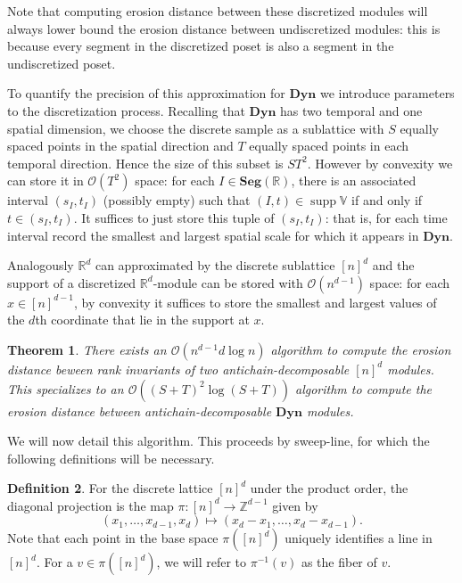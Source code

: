 \documentclass[a4paper,UKenglish,thm-restate]{article}
\newtheorem{theorem}{Theorem}[section]
\theoremstyle{definition}
\newtheorem{definition}[theorem]{Definition}
\def\bbv{\mathbb{V}}
\def\bdyn{\mathbf{Dyn}}
\DeclareMathOperator{\supp}{supp}
\begin{document}
            Note that computing erosion distance between these discretized modules will always lower bound the erosion distance between undiscretized modules: this is because every segment in the discretized poset is also a segment in the undiscretized poset. 

            To quantify the precision of this approximation for $\bdyn$ we introduce parameters to the discretization process. Recalling that $\mathbf{Dyn}$ has two temporal and one spatial dimension, we choose the discrete sample as a sublattice with $S$ equally spaced points in the spatial direction and $T$ equally spaced points in each temporal direction. Hence the size of this subset is $ST^2$. However by convexity we can store it in $\mathcal{O}(T^2)$ space: for each $I \in \mathbf{Seg}(\mathbb{R})$, there is an associated interval $(s_I, t_I)$ (possibly empty) such that $(I, t) \in \supp \bbv$ if and only if $t \in (s_I, t_I)$. It suffices to just store this tuple of $(s_I, t_I)$: that is, for each time interval record the smallest and largest spatial scale for which it appears in $\mathbf{Dyn}$. 
            
            Analogously $\mathbb{R}^d$ can approximated by the discrete sublattice $[n]^d$ and the support of a discretized $\mathbb{R}^d$-module can be stored with $\mathcal{O}(n^{d-1})$ space: for each $x \in [n]^{d-1}$, by convexity it suffices to store the smallest and largest values of the $d$th coordinate that lie in the support at $x$.
            \begin{theorem}\label{dEquadratic}
                There exists an $\mathcal{O}(n^{d-1} d \log{n})$ algorithm to compute the erosion distance beween rank invariants of two antichain-decomposable $[n]^d$ modules. This specializes to an $\mathcal{O}((S+T)^2\log(S+T))$ algorithm to compute the erosion distance between antichain-decomposable $\mathbf{Dyn}$ modules.
            \end{theorem}


            We will now detail this algorithm. This proceeds by sweep-line, for which the following definitions will be necessary.
            \begin{definition}
                For the discrete lattice $[n]^d$ under the product order, the diagonal projection is the map $\pi: [n]^d \rightarrow \mathbb{Z}^{d-1}$ given by \[(x_1, \ldots, x_{d-1}, x_d) \mapsto (x_d - x_1, \ldots, x_d - x_{d-1}).\]
                Note that each point in the base space $\pi([n]^d)$ uniquely identifies a line in $[n]^d$. For a $v \in \pi([n]^d)$, we will refer to $\pi^{-1}(v)$ as the fiber of $v$.
            \end{definition}
\end{document}

